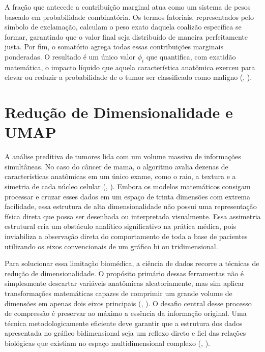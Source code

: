 \documentclass[
    12pt
    ,oneside
    ,a4paper
    ,chapter=TITLE
    ,section=TITLE
    ,sumario=abnt-6027-2012
    ,english,brazil]{abntex2} %
\begin{document}
A fração que antecede a contribuição marginal atua como um sistema de pesos baseado em probabilidade combinatória. Os termos fatoriais, representados pelo símbolo de exclamação, calculam o peso exato daquela coalizão específica se formar, garantindo que o valor final seja distribuído de maneira perfeitamente justa. Por fim, o somatório agrega todas essas contribuições marginais ponderadas. O resultado é um único valor $\phi_i$ que quantifica, com exatidão matemática, o impacto líquido que aquela característica anatômica exerceu para elevar ou reduzir a probabilidade de o tumor ser classificado como maligno (, \citeyear{Lundberg2017}).

\section{Redução de Dimensionalidade e UMAP}
\label{sec:umap}

A análise preditiva de tumores lida com um volume massivo de informações simultâneas. No caso do câncer de mama, o algoritmo avalia dezenas de características anatômicas em um único exame, como o raio, a textura e a simetria de cada núcleo celular (, \citeyear{Street1993}). Embora os modelos matemáticos consigam processar e cruzar esses dados em um espaço de trinta dimensões com extrema facilidade, essa estrutura de alta dimensionalidade não possui uma representação física direta que possa ser desenhada ou interpretada visualmente. Essa assimetria estrutural cria um obstáculo analítico significativo na prática médica, pois inviabiliza a observação direta do comportamento de toda a base de pacientes utilizando os eixos convencionais de um gráfico bi ou tridimensional.

Para solucionar essa limitação biomédica, a ciência de dados recorre a técnicas de redução de dimensionalidade. O propósito primário dessas ferramentas não é simplesmente descartar variáveis anatômicas aleatoriamente, mas sim aplicar transformações matemáticas capazes de comprimir um grande volume de dimensões em apenas dois eixos principais (, \citeyear{James2023}). O desafio central desse processo de compressão é preservar ao máximo a essência da informação original. Uma técnica metodologicamente eficiente deve garantir que a estrutura dos dados apresentada no gráfico bidimensional seja um reflexo direto e fiel das relações biológicas que existiam no espaço multidimensional complexo (, \citeyear{Bollon2022}).
\end{document}

